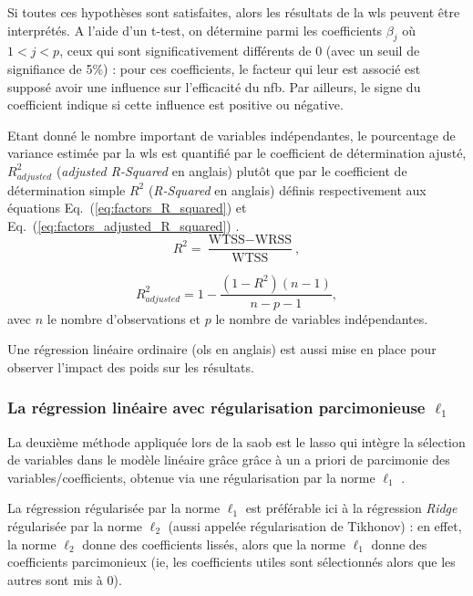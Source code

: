 Si toutes ces hypothèses sont satisfaites, alors les résultats de la \gls{wls} peuvent être interprétés. A l'aide d'un t-test, on détermine  
parmi les coefficients $\beta_{j}$ où $1<j<p$, ceux qui sont significativement différents de 0 (avec un seuil de signifiance de 5\%) : 
pour ces coefficients, le facteur qui leur est associé est supposé avoir une influence sur l'efficacité du \gls{nfb}. Par ailleurs, 
le signe du coefficient indique si cette influence est positive ou négative. 

Etant donné le nombre important de variables indépendantes, le pourcentage de variance estimée par la \gls{wls} est quantifié par le coefficient de 
détermination ajusté, $R^2_{adjusted}$ (\textit{adjusted R-Squared} en anglais) plutôt que par le coefficient de détermination simple $R^2$ (\textit{R-Squared} en anglais)
définis respectivement aux équations Eq.~(\ref{eq:factors_R_squared}) et Eq.~(\ref{eq:factors_adjusted_R_squared}) \citep{James2013}.
\begin{equation}
\label{eq:factors_R_squared}
R^2 = \frac{ \text{WTSS} - \text{WRSS} }{ \text{WTSS} }, 
\end{equation}

\begin{equation}
\label{eq:factors_adjusted_R_squared}
R^2_{adjusted} = 1 - \frac{ (1 - R^2) (n - 1) }{ n - p - 1 }, 
\end{equation}
avec $n$ le nombre d'observations et $p$ le nombre de variables indépendantes.


Une régression linéaire ordinaire (\gls{ols} en anglais) est aussi mise en place pour observer l'impact des poids sur les résultats. 

\subsubsection{La régression linéaire avec régularisation parcimonieuse $\ell_1$}

La deuxième méthode appliquée lors de la \gls{saob} est le \gls{lasso} qui intègre la sélection de variables dans le modèle linéaire grâce 
grâce à un a priori de parcimonie des variables/coefficients, obtenue via une régularisation par la norme $\ell_1$ \citep{Tibshirani1996}.

La régression régularisée par la norme $\ell_1$ est préférable ici à la régression \textit{Ridge} \citep{James2013} régularisée par 
la norme $\ell_2$ (aussi appelée régularisation de Tikhonov) : en effet, la norme $\ell_2$ donne des coefficients lissés, alors que la norme $\ell_1$ donne des coefficients parcimonieux 
(ie, les coefficients utiles sont sélectionnés alors que les autres sont mis à 0). 

